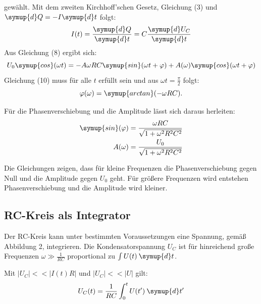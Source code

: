 gewählt. Mit dem zweiten Kirchhoff'schen Gesetz, Gleichung (3) und $\symup{d}Q = -I\symup{d}t$ folgt:
\begin{equation}
  I(t) = \frac{\symup{d}Q}{\symup{d}t} = C\frac{\symup{d}U_C}{\symup{d}t}
\end{equation}
Aus Gleichung (8) ergibt sich:
\begin{equation}
  U_0 \symup{cos}(\omega t) = -A \omega RC \symup{sin}(\omega t + \varphi) + A(\omega) \symup{cos}(\omega t + \varphi)
\end{equation}
Gleichung (10) muss für alle $t$ erfüllt sein und aus $\omega t = \frac{\pi}{2}$ folgt:
\begin{equation}
  \varphi (\omega) = \symup{arctan} (-\omega RC).
\end{equation}

Für die Phasenverschiebung und die Amplitude lässt sich daraus herleiten:
\begin{align}
  \symup{sin}(\varphi) &= \frac{\omega RC}{\sqrt{1 + \omega^2 R^2C^2}} \\
  A(\omega) &= \frac{U_0}{\sqrt{1 + \omega^2 R^2C^2}}
\end{align}

Die Gleichungen zeigen, dass für kleine Frequenzen die Phasenverschiebung gegen Null und die Amplitude
gegen $U_0$ geht. Für größere Frequenzen wird entstehen Phasenverschiebung und die Amplitude wird kleiner.

\subsection{RC-Kreis als Integrator}
Der RC-Kreis kann unter bestimmten Voraussetzungen eine Spannung, gemäß Abbildung 2, integrieren.
Die Kondensatorspannung $U_C$ ist für hinreichend große Frequenzen $\omega \gg \frac{1}{RC}$ proportional
zu $\int U(t) \: \symup{d}t$.

Mit $|U_C| << |I(t)R|$ und $|U_C| << |U|$ gilt:
\begin{equation}
  U_C(t) = \frac{1}{RC} \int_{0}^{t} U(t') \: \symup{d}t'
\end{equation}

